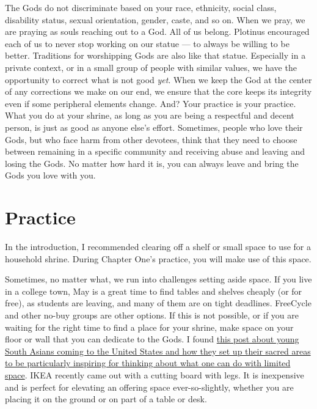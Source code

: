 \documentclass[
]{book}
\begin{document}
The Gods do not discriminate based on your race, ethnicity, social class, disability status, sexual orientation, gender, caste, and so on. When we pray, we are praying as souls reaching out to a God. All of us belong. Plotinus encouraged each of us to never stop working on our statue --- to always be willing to be better. Traditions for worshipping Gods are also like that statue. Especially in a private context, or in a small group of people with similar values, we have the opportunity to correct what is not good \emph{yet}. When we keep the God at the center of any corrections we make on our end, we ensure that the core keeps its integrity even if some peripheral elements change. And? Your practice is your practice. What you do at your shrine, as long as you are being a respectful and decent person, is just as good as anyone else's effort. Sometimes, people who love their Gods, but who face harm from other devotees, think that they need to choose between remaining in a specific community and receiving abuse and leaving and losing the Gods. No matter how hard it is, you can always leave and bring the Gods you love with you.

\hypertarget{practice}{%
\section{Practice}\label{practice}}

In the introduction, I recommended clearing off a shelf or small space to use for a household shrine. During Chapter One's practice, you will make use of this space.

Sometimes, no matter what, we run into challenges setting aside space. If you live in a college town, May is a great time to find tables and shelves cheaply (or for free), as students are leaving, and many of them are on tight deadlines. FreeCycle and other no-buy groups are other options. If this is not possible, or if you are waiting for the right time to find a place for your shrine, make space on your floor or wall that you can dedicate to the Gods. I found \href{https://web.archive.org/web/20220103123537/https://religionnews.com/2021/10/13/millennial-hindus-get-creative-with-home-temples-in-cramped-apartments/?utm_source=pocket_mylist}{this post about young South Asians coming to the United States and how they set up their sacred areas to be particularly inspiring for thinking about what one can do with limited space}. IKEA recently came out with a cutting board with legs. It is inexpensive and is perfect for elevating an offering space ever-so-slightly, whether you are placing it on the ground or on part of a table or desk.
\end{document}

